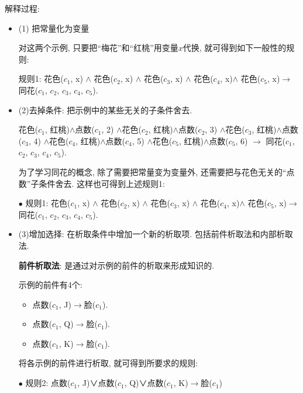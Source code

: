 解释过程:
\begin{itemize}
\item (1) 把常量化为变量
\begin{example}
对这两个示例, 只要把“梅花”和“红桃”用变量$x$代换, 就可得到如下一般性的规则:

    规则1: 花色($c_1$, x) $\wedge$ 花色($c_2$, x) $\wedge$ 花色($c_3$, x) $\wedge$ 花色($c_4$, x)$\wedge$ 花色($c_5$, x)$\rightarrow$ 同花($c_1$, $c_2$, $c_3$, $c_4$, $c_5$).
\end{example}

\item (2)去掉条件: 把示例中的某些无关的子条件舍去.

\begin{example}
  花色($c_1$, 红桃)$\wedge$点数($c_1$, 2)
            $\wedge$花色($c_2$, 红桃)$\wedge$点数($c_2$, 3)
            $\wedge$花色($c_3$, 红桃)$\wedge$点数($c_3$, 4)
            $\wedge$花色($c_4$, 红桃)$\wedge$点数($c_4$, 5)
            $\wedge$花色($c_5$, 红桃)$\wedge$点数($c_5$, 6)
          $\rightarrow$ 同花($c_1$, $c_2$, $c_3$, $c_4$, $c_5$).
\end{example}

为了学习同花的概念, 除了需要把常量变为变量外, 还需要把与花色无关的“点数”子条件舍去. 这样也可得到上述规则1:

$\bullet$ 规则1: 花色($c_1$, x) $\wedge$ 花色($c_2$, x) $\wedge$ 花色($c_3$, x) $\wedge$ 花色($c_4$, x)$\wedge$ 花色($c_5$, x)$\rightarrow$ 同花($c_1$, $c_2$, $c_3$, $c_4$, $c_5$).

\item (3)增加选择: 在析取条件中增加一个新的析取项. 包括前件析取法和内部析取法.

\textbf{前件析取法}: 是通过对示例的前件的析取来形成知识的.

\begin{example}示例的前件有4个:
\begin{itemize}
\item 点数($c_1$, J)$\rightarrow$脸($c_1$).
\item 点数($c_1$, Q)$\rightarrow$脸($c_1$).
\item 点数($c_1$, K)$\rightarrow$脸($c_1$).
\end{itemize}

将各示例的前件进行析取, 就可得到所要求的规则:

 $\bullet$ 规则2: 点数($c_1$, J)∨点数($c_1$, Q)∨点数($c_1$, K)$\rightarrow$脸($c_1$)
\end{example}


\end{itemize}
